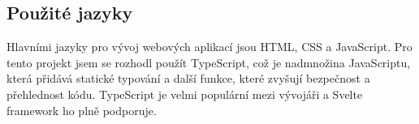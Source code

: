 \subsection{Použité jazyky}
Hlavními jazyky pro vývoj webových aplikací jsou HTML, CSS a JavaScript. Pro tento projekt jsem se rozhodl použít TypeScript, což je nadmnožina JavaScriptu, která přidává statické typování a další funkce, které zvyšují bezpečnost a přehlednost kódu. TypeScript je velmi populární mezi vývojáři a Svelte framework ho plně podporuje.